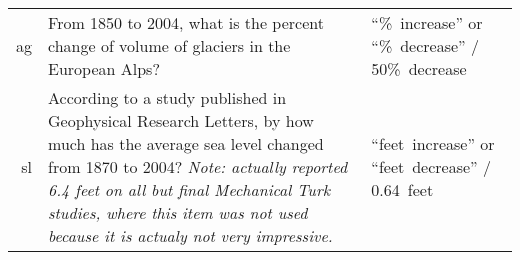 \begin{table}
\begin{tabu}{>{\sffamily}rX[3]X[-1,l]}
ag &
From 1850 to 2004, what is the percent change of volume of glaciers in the
European Alps? &
“\%~increase” or “\%~decrease” /
50\%~decrease \\

sl &
According to a study published in Geophysical Research Letters, by how much has
the average sea level changed from 1870 to 2004?  \emph{Note: actually reported 6.4
feet on all but final Mechanical Turk studies, where this item was not used
because it is actualy not very impressive.} &
“feet~increase” or “feet~decrease” /
0.64~feet \\
\bottomrule
\end{tabu}
\end{table}
